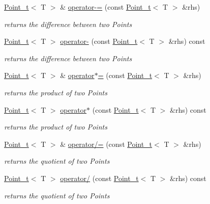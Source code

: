 \begin{DoxyCompactItemize}
\hyperlink{class_point__t}{Point\+\_\+t}$<$ T $>$ \& \hyperlink{class_point__t_a510c1649a1ff3b46bb602a48de37d7c0}{operator-\/=} (const \hyperlink{class_point__t}{Point\+\_\+t}$<$ T $>$ \&rhs)
\begin{DoxyCompactList}\small\item\em returns the difference between two Points \end{DoxyCompactList}\item 
\hyperlink{class_point__t}{Point\+\_\+t}$<$ T $>$ \hyperlink{class_point__t_ab20b4b331780f76392d465f498ca14e1}{operator-\/} (const \hyperlink{class_point__t}{Point\+\_\+t}$<$ T $>$ \&rhs) const
\begin{DoxyCompactList}\small\item\em returns the difference between two Points \end{DoxyCompactList}\item 
\hyperlink{class_point__t}{Point\+\_\+t}$<$ T $>$ \& \hyperlink{class_point__t_aefb9c2d617458a15d475690641e51b37}{operator$\ast$=} (const \hyperlink{class_point__t}{Point\+\_\+t}$<$ T $>$ \&rhs)
\begin{DoxyCompactList}\small\item\em returns the product of two Points \end{DoxyCompactList}\item 
\hyperlink{class_point__t}{Point\+\_\+t}$<$ T $>$ \hyperlink{class_point__t_a56b84bb4471a147a920444370b5bd9bc}{operator$\ast$} (const \hyperlink{class_point__t}{Point\+\_\+t}$<$ T $>$ \&rhs) const
\begin{DoxyCompactList}\small\item\em returns the product of two Points \end{DoxyCompactList}\item 
\hyperlink{class_point__t}{Point\+\_\+t}$<$ T $>$ \& \hyperlink{class_point__t_a7d548221c6fbe6401682052a5121aa9b}{operator/=} (const \hyperlink{class_point__t}{Point\+\_\+t}$<$ T $>$ \&rhs)
\begin{DoxyCompactList}\small\item\em returns the quotient of two Points \end{DoxyCompactList}\item 
\hyperlink{class_point__t}{Point\+\_\+t}$<$ T $>$ \hyperlink{class_point__t_a8ee1a27bc0d6386c7af20006956cab41}{operator/} (const \hyperlink{class_point__t}{Point\+\_\+t}$<$ T $>$ \&rhs) const
\begin{DoxyCompactList}\small\item\em returns the quotient of two Points \end{DoxyCompactList}\item 

\end{DoxyCompactItemize}
